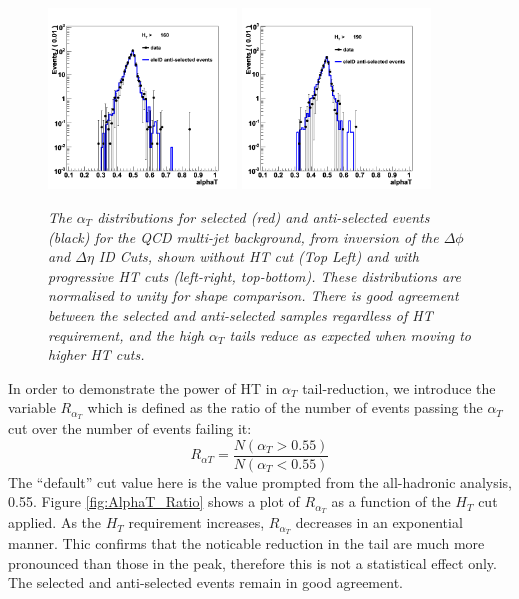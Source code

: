 \begin{figure}[h!]
\hspace*{3mm}
\includegraphics[width=50mm]{Plots/mc-alphaT-5}
\hspace*{3mm}
\includegraphics[width=50mm]{Plots/mc-alphaT-6}

\caption{\textit{The $\alpha_{T}$ distributions for selected (red) and anti-selected events (black) for the QCD multi-jet background, from inversion of the $\Delta \phi$ and $\Delta \eta$ ID Cuts, shown without HT cut (Top Left) and with progressive HT cuts (left-right, top-bottom). These distributions are normalised to unity for shape comparison. There is good agreement between the selected and anti-selected samples regardless of HT requirement, and the high $\alpha_{T}$ tails reduce as expected when moving to higher HT cuts.}}
\label{fig:AlphaTbyHT}
\end{figure}

In order to demonstrate the power of HT in $\alpha_{T}$ tail-reduction, we introduce the variable $R_{\alpha_T}$ which is defined as the ratio of the number of events passing the $\alpha_T$ cut over the number of events failing it:
\begin{equation}
R_{\alpha T} = \frac{N(\alpha_{T}>0.55)}{N(\alpha_{T}<0.55)}
\end{equation}
The ``default'' cut value here is the value prompted from the all-hadronic analysis, 0.55. Figure \ref{fig:AlphaT_Ratio} shows a plot of $R_{\alpha_T}$ as a function of the $H_{T}$ cut applied. As the $H_{T}$ requirement increases, $R_{\alpha_T}$ decreases in an exponential manner. Thic confirms that the noticable reduction in the tail are much more pronounced than those in the peak, therefore this is not a statistical effect only. The selected and anti-selected events remain in good agreement.

